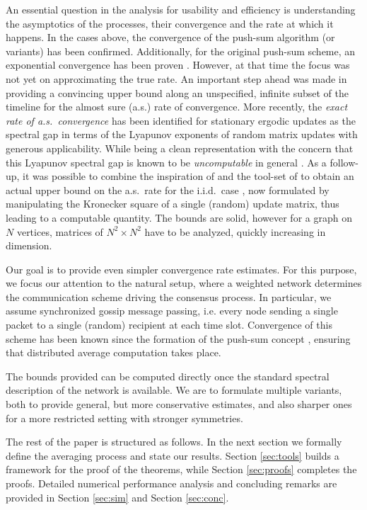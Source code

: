 \documentclass[a4paper,12pt]{article}
\begin{document}
	An essential question in the analysis for usability and efficiency is understanding the asymptotics of the processes, their convergence and the rate at which it happens.
	In the cases above, the convergence of the push-sum algorithm (or variants) has been confirmed. Additionally, for the original push-sum scheme, an exponential convergence has been proven \cite{kempe2003gossip}. However, at that time the focus was not yet on approximating the true rate.
	An important step ahead was made in \cite{iutzeler2013analysis} providing a convincing upper bound along an unspecified, infinite subset of the timeline for the almost sure (a.s.) rate of convergence.
	More recently, the \emph{exact rate of a.s.\ convergence} has been identified \cite{gerencsr2019tight} for stationary ergodic updates as the spectral gap in terms of the Lyapunov exponents of random matrix updates with generous applicability. While being a clean representation with the concern that this Lyapunov spectral gap is known to be \emph{uncomputable} in general \cite{tsitsiklis1997lyapunov}. 
	As a follow-up, it was possible to combine the inspiration of \cite{iutzeler2013analysis} and the tool-set of \cite{gerencsr2019tight} to obtain an actual upper bound on the a.s.\ rate for the i.i.d.\ case \cite{gerencser2022computable}, now formulated by manipulating the Kronecker square of a single (random) update matrix, thus leading to a computable quantity. The bounds are solid, however for a graph on $N$ vertices, matrices of $N^2\times N^2$ have to be analyzed, quickly increasing in dimension.
	
	Our goal is to provide even simpler convergence rate estimates. For this purpose, we focus our attention to the natural setup, where a weighted network determines the communication scheme driving the consensus process. In particular, we assume synchronized gossip message passing, i.e. every node sending a single packet to a single (random) recipient at each time slot. Convergence of this scheme has been known since the formation of the push-sum concept \cite{kempe2003gossip}, ensuring that distributed average computation takes place.
	
	The bounds provided can be computed directly once the standard spectral description of the network is available. We are to formulate multiple variants, both to provide general, but more conservative estimates, and also sharper ones for a more restricted setting with stronger symmetries.
	
	The rest of the paper is structured as follows. In the next section we formally define the averaging process and state our results. Section \ref{sec:tools} builds a framework for the proof of the theorems, while Section \ref{sec:proofs} completes the proofs. Detailed numerical performance analysis and concluding remarks are provided in Section \ref{sec:sim} and Section \ref{sec:conc}. 
	
\end{document}

